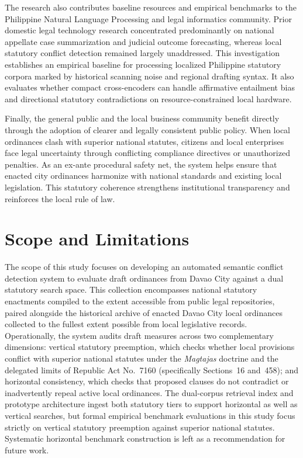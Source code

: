 The research also contributes baseline resources and empirical benchmarks to the Philippine Natural Language Processing and legal informatics community. Prior domestic legal technology research concentrated predominantly on national appellate case summarization and judicial outcome forecasting, whereas local statutory conflict detection remained largely unaddressed. This investigation establishes an empirical baseline for processing localized Philippine statutory corpora marked by historical scanning noise and regional drafting syntax. It also evaluates whether compact cross-encoders can handle affirmative entailment bias and directional statutory contradictions on resource-constrained local hardware.

Finally, the general public and the local business community benefit directly through the adoption of clearer and legally consistent public policy. When local ordinances clash with superior national statutes, citizens and local enterprises face legal uncertainty through conflicting compliance directives or unauthorized penalties. As an ex-ante procedural safety net, the system helps ensure that enacted city ordinances harmonize with national standards and existing local legislation. This statutory coherence strengthens institutional transparency and reinforces the local rule of law.


\section{Scope and Limitations}
The scope of this study focuses on developing an automated semantic conflict detection system to evaluate draft ordinances from Davao City against a dual statutory search space. This collection encompasses national statutory enactments compiled to the extent accessible from public legal repositories, paired alongside the historical archive of enacted Davao City local ordinances collected to the fullest extent possible from local legislative records. Operationally, the system audits draft measures across two complementary dimensions: vertical statutory preemption, which checks whether local provisions conflict with superior national statutes under the \textit{Magtajas} doctrine and the delegated limits of Republic Act No.~7160 (specifically Sections~16 and~458); and horizontal consistency, which checks that proposed clauses do not contradict or inadvertently repeal active local ordinances. The dual-corpus retrieval index and prototype architecture ingest both statutory tiers to support horizontal as well as vertical searches, but formal empirical benchmark evaluations in this study focus strictly on vertical statutory preemption against superior national statutes. Systematic horizontal benchmark construction is left as a recommendation for future work.

